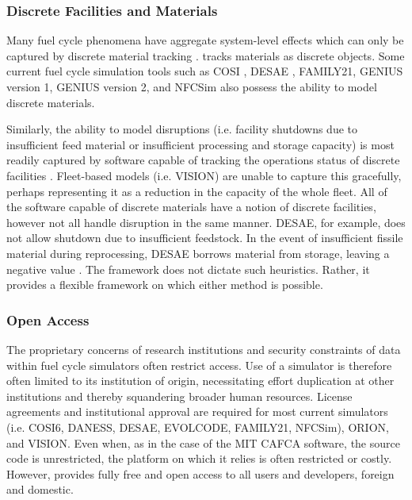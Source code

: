 
\subsubsection{Discrete Facilities and Materials}

Many fuel cycle phenomena have aggregate system-level effects which can only be
captured by discrete material tracking \cite{huff_next_2010}.  \Cyclus
tracks materials as discrete objects. Some current fuel cycle simulation tools
such as \gls{COSI}
\cite{mccarthy_benchmark_2012,grasso_nea-wpfc/fcts_2009,guerin_benchmark_2009},
\gls{DESAE}
\cite{andrianova_desae_2008}, FAMILY21\cite{mccarthy_benchmark_2012},
\gls{GENIUS} version 1, \gls{GENIUS} version 2, and \gls{NFCSim} also possess the ability to
model discrete materials.

Similarly, the ability to model disruptions (i.e. facility shutdowns due to
insufficient feed material or insufficient processing and storage capacity) is
most readily captured by software capable of tracking the operations status of
discrete facilities \cite{huff_next_2010}.  Fleet-based models (i.e.
\gls{VISION}) are unable to capture this gracefully, perhaps representing it as 
a reduction in the capacity of the whole fleet.  All of the software
capable of discrete materials have a notion of discrete facilities, however not
all handle disruption in the same manner. \gls{DESAE}, for example, does not
allow shutdown due to insufficient feedstock. In the event
of insufficient fissile material during reprocessing, \gls{DESAE} borrows
material from storage, leaving a negative value \cite{mccarthy_benchmark_2012}.
The \Cyclus framework does not dictate such heuristics. Rather, it provides a
flexible framework on which either method is possible.

\subsubsection{Open Access}


The proprietary concerns of research institutions and security constraints of
data within fuel cycle simulators often restrict access. Use of a simulator is
therefore often limited to its institution of origin, necessitating effort
duplication at other institutions and thereby squandering broader human
resources. License agreements and institutional approval are required for most
current simulators (i.e. \gls{COSI}6, \gls{DANESS}, \gls{DESAE}, EVOLCODE,
FAMILY21, \gls{NFCSim})\cite{juchau_modeling_2010}, ORION, and VISION.  Even when, as in
the case of the MIT \gls{CAFCA} software, the source code is unrestricted, the
platform on which it relies is often restricted or costly.  However, \Cyclus
provides fully free and open access to all users
and developers, foreign and domestic.

